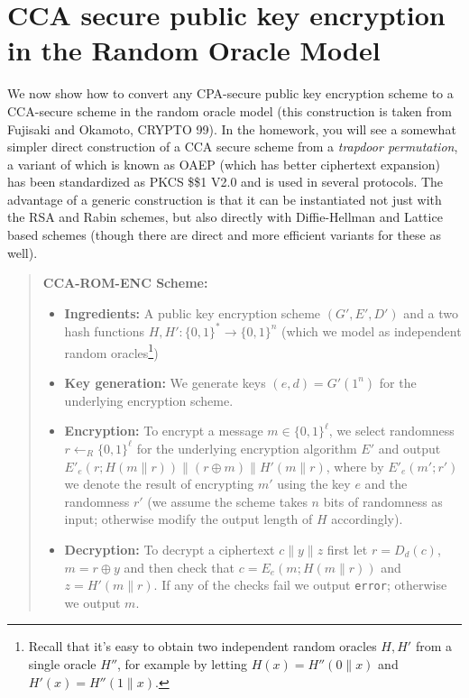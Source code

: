 \section{CCA secure public key encryption in the Random Oracle
Model}\label{CCA-secure-public-key-enc}

We now show how to convert any CPA-secure public key encryption scheme
to a CCA-secure scheme in the random oracle model (this construction is
taken from Fujisaki and Okamoto, CRYPTO 99). In the homework, you will
see a somewhat simpler direct construction of a CCA secure scheme from a
\emph{trapdoor permutation}, a variant of which is known as OAEP (which
has better ciphertext expansion) has been standardized as PKCS
\$\sharp\$1 V2.0 and is used in several protocols. The advantage of a
generic construction is that it can be instantiated not just with the
RSA and Rabin schemes, but also directly with Diffie-Hellman and Lattice
based schemes (though there are direct and more efficient variants for
these as well).

\begin{quote}
\textbf{CCA-ROM-ENC Scheme:}

\begin{itemize}
\item
  \textbf{Ingredients:} A public key encryption scheme \((G',E',D')\)
  and a two hash functions \(H,H':\{0,1\}^*\rightarrow\{0,1\}^n\) (which
  we model as independent random oracles\footnote{Recall that it's easy
    to obtain two independent random oracles \(H,H'\) from a single
    oracle \(H''\), for example by letting \(H(x)=H''(0\|x)\) and
    \(H'(x)=H''(1\|x)\).})
\item
  \textbf{Key generation:} We generate keys \((e,d)=G'(1^n)\) for the
  underlying encryption scheme.
\item
  \textbf{Encryption:} To encrypt a message \(m\in\{0,1\}^\ell\), we
  select randomness \(r\leftarrow_R\{0,1\}^\ell\) for the underlying
  encryption algorithm \(E'\) and output
  \(E'_e(r;H(m\|r))\|(r \oplus m)\|H'(m\|r)\), where by \(E'_e(m';r')\)
  we denote the result of encrypting \(m'\) using the key \(e\) and the
  randomness \(r'\) (we assume the scheme takes \(n\) bits of randomness
  as input; otherwise modify the output length of \(H\) accordingly).
\item
  \textbf{Decryption:} To decrypt a ciphertext \(c\|y\|z\) first let
  \(r=D_d(c)\), \(m=r \oplus y\) and then check that
  \(c=E_e(m;H(m\|r))\) and \(z=H'(m\|r)\). If any of the checks fail we
  output \texttt{error}; otherwise we output \(m\).
\end{itemize}
\end{quote}

